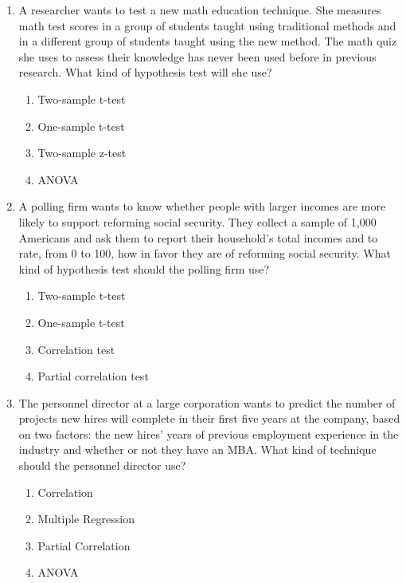 \documentclass{article}
\begin{document}
\begin{enumerate}[label=\textbf{Q\arabic*:}]
    \item A researcher wants to test a new math education technique. She measures math test scores in a group of students taught using traditional methods and in a different group of students taught using the new method. The math quiz she uses to assess their knowledge has never been used before in previous research. What kind of hypothesis test will she use?
    \begin{enumerate}[label=\alph*)]
        \item Two-sample t-test
        \item One-sample t-test
        \item Two-sample z-test
        \item ANOVA
    \end{enumerate}

    \item A polling firm wants to know whether people with larger incomes are more likely to support reforming social security. They collect a sample of 1,000 Americans and ask them to report their household’s total incomes and to rate, from 0 to 100, how in favor they are of reforming social security. What kind of hypothesis test should the polling firm use?
    \begin{enumerate}[label=\alph*)]
        \item Two-sample t-test
        \item One-sample t-test
        \item Correlation test
        \item Partial correlation test
    \end{enumerate}

    \item The personnel director at a large corporation wants to predict the number of projects new hires will complete in their first five years at the company, based on two factors: the new hires’ years of previous employment experience in the industry and whether or not they have an MBA. What kind of technique should the personnel director use?
    \begin{enumerate}[label=\alph*)]
        \item Correlation
        \item Multiple Regression
        \item Partial Correlation
        \item ANOVA
    \end{enumerate}


\end{enumerate}
\end{document}
